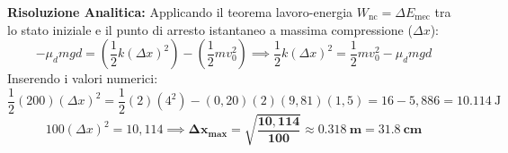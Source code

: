 \textbf{Risoluzione Analitica:}
Applicando il teorema lavoro-energia $W_{\text{nc}} = \Delta E_{\text{mec}}$ tra lo stato iniziale e il punto di arresto istantaneo a massima compressione ($\Delta x$):
\begin{equation}
    -\mu_d mg d = \left(\frac{1}{2}k(\Delta x)^2\right) - \left(\frac{1}{2}m v_0^2\right) \implies \frac{1}{2}k(\Delta x)^2 = \frac{1}{2}m v_0^2 - \mu_d mg d
\end{equation}
Inserendo i valori numerici:
\begin{equation}
    \frac{1}{2}(200)(\Delta x)^2 = \frac{1}{2}(2)(4^2) - (0{,}20)(2)(9{,}81)(1{,}5) = 16 - 5{,}886 = \SI{10.114}{\joule}
\end{equation}
\begin{equation}
    100(\Delta x)^2 = 10{,}114 \implies \mathbf{\Delta x_{\max} = \sqrt{\frac{10{,}114}{100}} \approx \SI{0.318}{\metre} = \SI{31.8}{\centi\metre}}
\end{equation}
